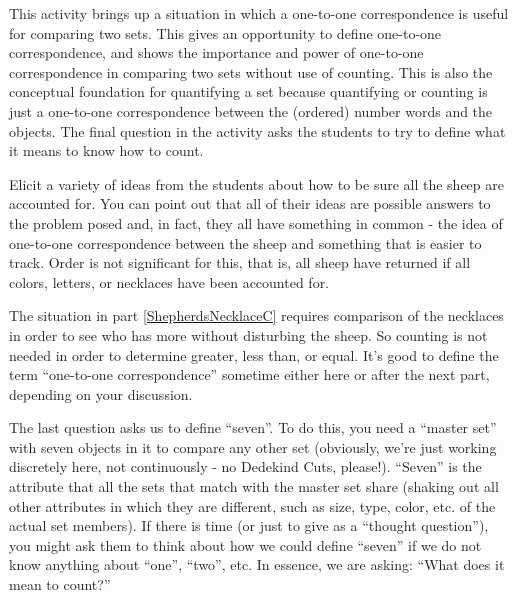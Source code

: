 \documentclass{ximera}
\begin{document}
\newpage
\begin{instructorNotes}

This activity brings up a situation in which a one-to-one correspondence is useful for comparing two sets.  This gives an opportunity to define one-to-one correspondence, and shows the importance and power of one-to-one correspondence in comparing two sets without use of counting.  This is also the conceptual foundation for quantifying a set because quantifying or counting is just a one-to-one correspondence between the (ordered) number words and the objects.  The final question in the activity asks the students to try to define what it means to know how to count.


Elicit a variety of ideas from the students about how to be sure all the sheep are accounted for.  You can point out that all of their ideas are possible answers to the problem posed and, in fact, they all have something in common - the idea of one-to-one correspondence between the sheep and something that is easier to track.  Order is not significant for this, that is, all sheep have returned if all colors, letters, or necklaces have been accounted for.


The situation in part \ref{ShepherdsNecklaceC} requires comparison of the necklaces in order to see who has more without disturbing the sheep.  So counting is not needed in order to determine greater, less than, or equal. It's good to define the term ``one-to-one correspondence'' sometime either here or after the next part, depending on your discussion.



The last question asks us to define ``seven''. To do this, you need a ``master set'' with seven objects in it to compare any other set (obviously, we're just working discretely here, not continuously - no Dedekind Cuts, please!).  ``Seven'' is the attribute that all the sets that match with the master set share (shaking out all other attributes in which they are different, such as size, type, color, etc. of the actual set members).  If there is time (or just to give as a ``thought question''), you might ask them to think about how we could define ``seven'' if we do not know anything about ``one'', ``two'', etc.  In essence, we are asking: ``What does it mean to count?''


\end{instructorNotes}
\end{document}
